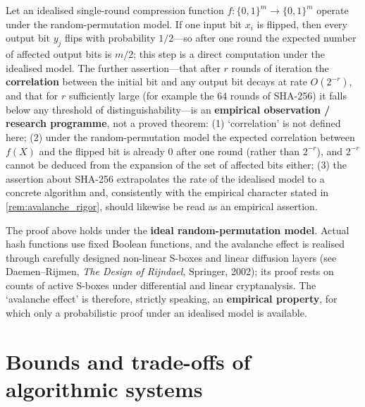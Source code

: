 \begin{remark}\label{prop:avalanche_effect}
Let an idealised single-round compression function $f: \{0,1\}^m \to \{0,1\}^m$ operate under the random-permutation model. If one input bit $x_i$ is flipped, then every output bit $y_j$ flips with probability $1/2$---so after one round the expected number of affected output bits is $m/2$; this step is a direct computation under the idealised model.
The further assertion---that after $r$ rounds of iteration the \textbf{correlation} between the initial bit and any output bit decays at rate $O(2^{-r})$, and that for $r$ sufficiently large (for example the $64$ rounds of SHA-256) it falls below any threshold of distinguishability---is an \textbf{empirical observation / research programme}, not a proved theorem: (1) `correlation' is not defined here; (2) under the random-permutation model the expected correlation between $f(X)$ and the flipped bit is already $0$ after one round (rather than $2^{-r}$), and $2^{-r}$ cannot be deduced from the expansion of the set of affected bits either; (3) the assertion about SHA-256 extrapolates the rate of the idealised model to a concrete algorithm and, consistently with the empirical character stated in \cref{rem:avalanche_rigor}, should likewise be read as an empirical assertion.
\end{remark}

\begin{remark}\label{rem:avalanche_rigor}
The proof above holds under the \textbf{ideal random-permutation model}. Actual hash functions use fixed Boolean functions, and the avalanche effect is realised through carefully designed non-linear S-boxes and linear diffusion layers (see Daemen--Rijmen, \textit{The Design of Rijndael}, Springer, 2002); its proof rests on counts of active S-boxes under differential and linear cryptanalysis. The `avalanche effect' is therefore, strictly speaking, an \textbf{empirical property}, for which only a probabilistic proof under an idealised model is available.
\end{remark}

\section{Bounds and trade-offs of algorithmic systems}

